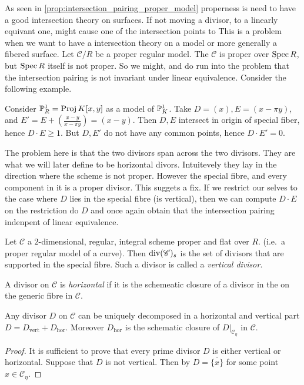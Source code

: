 
As seen in \cref{prop:intersection_pairing_proper_model} properness is need to have a good intersection theory on surfaces. 
If not moving a divisor, to a linearly equivant one, might cause one of the intersection points to 
This is a problem when we want to have a intersection theory on a model or more generally a fibered surface. 
Let $\mathscr C  / R $ be a proper regular model. 
The $\mathscr C$ is proper over $\operatorname{Spec} R$, but $\operatorname{Spec} R$ itself is not proper. 
So we might, and do run into the problem that the intersection pairing is not invariant under linear equivalence. Consider the following example.

\begin{example}\label{ex:first_model}
	Consider $\mathbb{P}^{1}_R = \operatorname{Proj} K[x, y]$ as a model of $\mathbb{P}^{1}_K$. 
	Take $D = (x), E = (x-\pi y )$, and $E' = E + (\frac{x-y}{x-\pi y})= (x - y)$.
	Then  $D, E$ intersect in origin of special fiber, hence $D\cdot E \ge 1$. 
	But $D, E'$ do not have any common points, hence $D \cdot E' = 0$. 
\end{example}

The problem here is that the two divisors span across the two divisors. They are what we will later define to be horizontal divors. Intuitevely they lay in the direction where the scheme is not proper. 
However the special fibre, and every component in it is a proper divisor. 
This suggets a fix.
If we restrict our selves to the case where $D$ lies in the special fibre (is vertical), then we can compute $D\cdot E$ on the restriction do $D$ and once again obtain that the intersection pairing indenpent of linear equivalence. 

\begin{definition}\label{def:vertical_divisor}
	Let $\mathscr{C}$ a $2$-dimensional, regular, integral scheme proper and flat over $R$.  (i.e.\ a proper regular model of a curve). 
	Then $\operatorname{div}(\mathscr{C})_s$ is the set of divisors that are supported in the special fibre. 
	Such a divisor is called a \emph{vertical divisor}.
\end{definition}
\begin{definition}\label{def:horizontal_divisor}
	A divisor on $\mathscr{C} $ is \emph{horizontal} if it is the schemeatic closure of a divisor in the on the generic fibre in $\mathscr C$. 
\end{definition}
\begin{lemma}\label{lem:decomponsition_horizontal_vertical}
	Any divisor $D$ on $\mathscr{C}$ can be uniquely decomposed in a horizontal and vertical part $D =  D_\text{vert}  + D_\text{hor}$. 
	Moreover $D_\text{hor} $ is the schematic closure of $D|_{\mathscr C_\eta}$ in $\mathscr C$.
\end{lemma}
\begin{proof}
	It is sufficient to prove that every prime divisor $D$ is either vertical or horizontal.
	Suppose that $D$ is not vertical. 
	Then by \cite[prop. 8.3.4]{liuAlgebraicGeometryArithmetic2002} $D = \overline{\{x\} }$ for some point $x \in \mathscr{C} _\eta$.
\end{proof}

